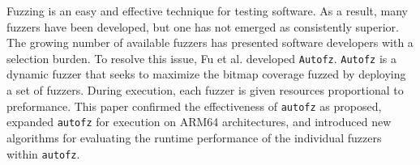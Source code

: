 \begin{Abstract}
Fuzzing is an easy and effective technique for testing software. As a result, 
many fuzzers have been developed, but one has not emerged as consistently superior. 
The growing number of available fuzzers has presented software developers with a 
selection burden.  To resolve this issue, Fu et al. developed \texttt{Autofz}. 
\texttt{Autofz} is a dynamic fuzzer that seeks to maximize the bitmap coverage fuzzed
by deploying a set of fuzzers. During execution, each fuzzer is given resources 
proportional to preformance. This paper confirmed the effectiveness of \texttt{autofz} 
as proposed, expanded \texttt{autofz} for execution on ARM64 architectures, and introduced new
algorithms for evaluating the runtime performance of the individual fuzzers within 
\texttt{autofz}.
\end{Abstract}